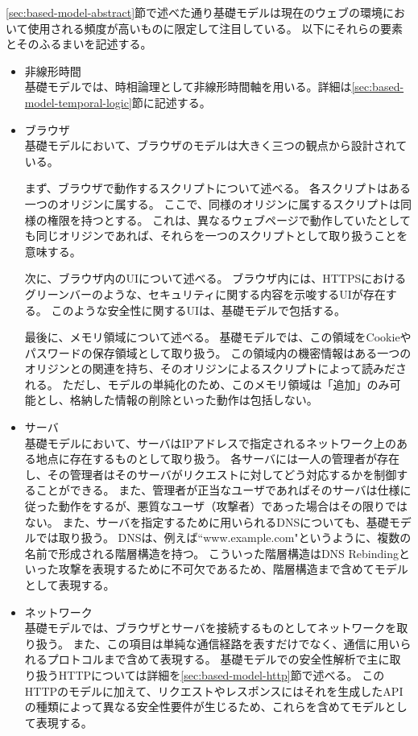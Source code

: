\documentclass[12pt,a4paper]{jbook}
\begin{document}
\ref{sec:based-model-abstract}節で述べた通り基礎モデルは現在のウェブの環境において使用される頻度が高いものに限定して注目している。
以下にそれらの要素とそのふるまいを記述する。
\begin{itemize}
\item 非線形時間 \\
基礎モデルでは、時相論理として非線形時間軸を用いる。詳細は\ref{sec:based-model-temporal-logic}節に記述する。
\item ブラウザ \\
基礎モデルにおいて、ブラウザのモデルは大きく三つの観点から設計されている。

まず、ブラウザで動作するスクリプトについて述べる。
\color{red}
各スクリプトはある一つのオリジンに属する。
ここで、同様のオリジンに属するスクリプトは同様の権限を持つとする。
\color{black}
これは、異なるウェブページで動作していたとしても同じオリジンであれば、それらを一つのスクリプトとして取り扱うことを意味する。

次に、ブラウザ内のUIについて述べる。
ブラウザ内には、HTTPSにおけるグリーンバーのような、セキュリティに関する内容を示唆するUIが存在する。
このような安全性に関するUIは、基礎モデルで包括する。

最後に、メモリ領域について述べる。
基礎モデルでは、この領域をCookieやパスワードの保存領域として取り扱う。
この領域内の機密情報はある一つのオリジンとの関連を持ち、そのオリジンによるスクリプトによって読みだされる。
ただし、モデルの単純化のため、このメモリ領域は「追加」のみ可能とし、格納した情報の削除といった動作は包括しない。
\item サーバ \\
基礎モデルにおいて、サーバはIPアドレスで指定されるネットワーク上のある地点に存在するものとして取り扱う。
各サーバには一人の管理者が存在し、その管理者はそのサーバがリクエストに対してどう対応するかを制御することができる。
また、管理者が正当なユーザであればそのサーバは仕様に従った動作をするが、悪質なユーザ（攻撃者）であった場合はその限りではない。
また、サーバを指定するために用いられるDNSについても、基礎モデルでは取り扱う。
DNSは、例えば``www.example.com"というように、複数の名前で形成される階層構造を持つ。
こういった階層構造はDNS Rebinding\cite{dns-rebinding}といった攻撃を表現するために不可欠であるため、階層構造まで含めてモデルとして表現する。
\item ネットワーク \\
基礎モデルでは、ブラウザとサーバを接続するものとしてネットワークを取り扱う。
また、この項目は単純な通信経路を表すだけでなく、通信に用いられるプロトコルまで含めて表現する。
基礎モデルでの安全性解析で主に取り扱うHTTPについては詳細を\ref{sec:based-model-http}節で述べる。
このHTTPのモデルに加えて、リクエストやレスポンスにはそれを生成したAPIの種類によって異なる安全性要件が生じるため、これらを含めてモデルとして表現する。
\end{itemize}
\end{document}
